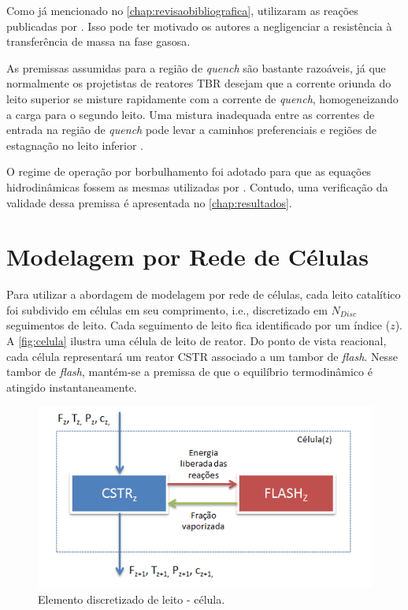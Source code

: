 Como já mencionado no \autoref{chap:revisaobibliografica},
 utilizaram as reações publicadas por
. Isso pode ter motivado os autores a negligenciar a
resistência à transferência de massa na fase gasosa.

As premissas assumidas para a região de \emph{quench} são bastante razoáveis, já
que normalmente os projetistas de reatores TBR desejam que a corrente oriunda do
leito superior se misture rapidamente com a corrente de \emph{quench},
homogeneizando a carga para o segundo leito. Uma mistura inadequada entre as
correntes de entrada na região de \emph{quench} pode levar a caminhos
preferenciais e regiões de estagnação no leito inferior \cite{Ancheyta2011}.

O regime de operação por borbulhamento foi adotado para que as
equações hidrodinâmicas fossem as mesmas utilizadas por .
Contudo, uma verificação da validade dessa premissa é apresentada no
\autoref{chap:resultados}.

\section{Modelagem por Rede de Células} \label{sec:modelagemredecelulas}

Para utilizar a abordagem de modelagem por rede de células, cada leito
catalítico foi subdivido em células em seu comprimento, i.e., discretizado em
$N_{Disc}$ seguimentos de leito. Cada seguimento de leito fica identificado por
um índice ($z$). A \autoref{fig:celula} ilustra uma célula de leito de
reator. Do ponto de vista reacional, cada célula representará um reator CSTR
associado a um tambor de \emph{flash}. Nesse tambor de \emph{flash}, mantém-se a
premissa de que o equilíbrio termodinâmico é atingido instantaneamente.

 \begin{figure}[htb]
 \centering \includegraphics[scale=0.75]{images/Chap3/celula.png}
 \caption{Elemento discretizado de leito - célula.}
 \label{fig:celula}
 \end{figure}

